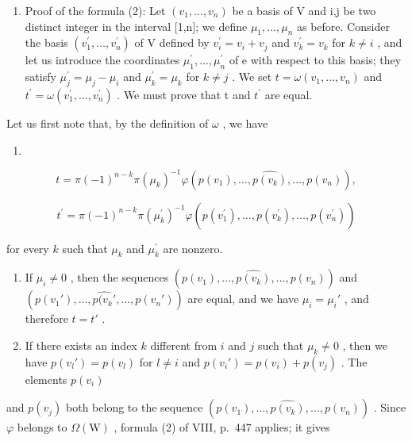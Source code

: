 \begin{enumerate}
\def\labelenumi{\Alph{enumi})}
\setcounter{enumi}{3}
\tightlist
\item
  Proof of the formula (2): Let \((v_{1},\ldots,v_{n})\) be a basis of V and i,j be two distinct integer in the interval {[}1,n{]}; we define \(\mu_{1},\ldots,\mu_{n}\) as before. Consider the basis \((v_{1}^{\prime},\ldots,v_{n}^{\prime})\) of V defined by \(v_{i}^{\prime}=v_{i}+v_{j}\) and \(v_{k}^{\prime}=v_{k}\) for \(k\neq i\) , and let us introduce the coordinates \(\mu_{1}^{\prime},\ldots,\mu_{n}^{\prime}\) of e with respect to this basis; they satisfy \(\mu_{j}^{\prime}=\mu_{j}-\mu_{i}\) and \(\mu_{k}^{\prime}=\mu_{k}\) for \(k\neq j\) . We set \(t=\omega(v_{1},\ldots,v_{n})\) and \(t^{\prime}=\omega(v_{1}^{\prime},\ldots,v_{n}^{\prime})\) . We must prove that t and \(t^{\prime}\) are equal.
\end{enumerate}

Let us first note that, by the definition of \(\omega\) , we have

\begin{enumerate}
\def\labelenumi{(\arabic{enumi})}
\setcounter{enumi}{11}
\tightlist
\item
\end{enumerate}

\[
t = \pi (- 1) ^ {n - k} \pi (\mu_ {k}) ^ {- 1} \varphi (p (v _ {1}), \ldots , \widehat {p (v _ {k})}, \ldots , p (v _ {n})),\tag{13}
\]

\[
t ^ {\prime} = \pi (- 1) ^ {n - k} \pi (\mu_ {k} ^ {\prime}) ^ {- 1} \varphi (p (v _ {1} ^ {\prime}), \ldots , \widehat {p (v _ {k} ^ {\prime})}, \ldots , p (v _ {n} ^ {\prime}))
\]

for every \(k\) such that \(\mu_{k}\) and \(\mu_k^\prime\) are nonzero.

\begin{enumerate}
\def\labelenumi{\alph{enumi})}
\item
  If \(\mu_i \neq 0\) , then the sequences \((p(v_1), \ldots, \widehat{p(v_k)}, \ldots, p(v_n))\) and \((p(v_1'), \ldots, \widehat{p(v_k'}, \ldots, p(v_n'))\) are equal, and we have \(\mu_i = \mu_i'\) , and therefore \(t = t'\) .
\item
  If there exists an index \(k\) different from \(i\) and \(j\) such that \(\mu_k \neq 0\) , then we have \(p(v_l') = p(v_l)\) for \(l \neq i\) and \(p(v_i') = p(v_i) + p(v_j)\) . The elements \(p(v_i)\)
\end{enumerate}

and \(p(v_{j})\) both belong to the sequence \((p(v_{1}),\ldots ,\widehat{p(v_{k})},\ldots ,p(v_{n}))\) . Since \(\varphi\) belongs to \(\Omega (\mathrm{W})\) , formula (2) of VIII, p.~447 applies; it gives


